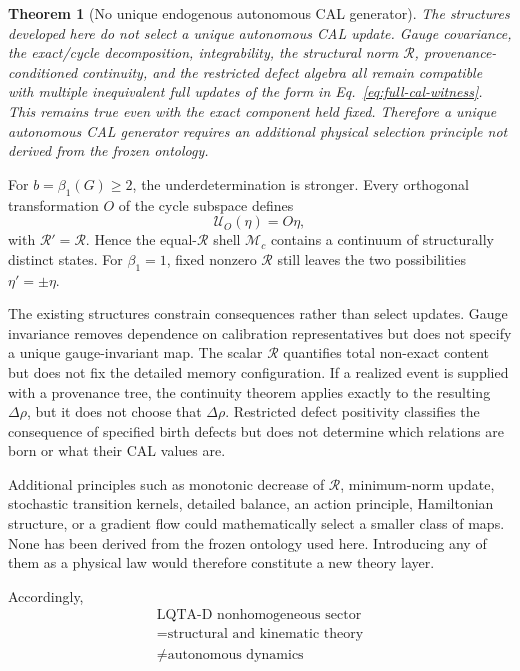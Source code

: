 \documentclass[aip,jmp,amsmath,amssymb,reprint]{revtex4-2}
\newtheorem{theorem}{Theorem}
\newcommand{\Rcal}{\mathcal{R}}
\begin{document}
\begin{theorem}[No unique endogenous autonomous CAL generator]\label{thm:generator-nogo}
The structures developed here do not select a unique autonomous CAL update. Gauge covariance, the exact/cycle decomposition, integrability, the structural norm $\Rcal$, provenance-conditioned continuity, and the restricted defect algebra all remain compatible with multiple inequivalent full updates of the form in Eq.~\eqref{eq:full-cal-witness}. This remains true even with the exact component held fixed. Therefore a unique autonomous CAL generator requires an additional physical selection principle not derived from the frozen ontology.
\end{theorem}

For $b=\beta_1(G)\ge2$, the underdetermination is stronger. Every orthogonal transformation $O$ of the cycle subspace defines
\begin{equation}
\mathcal U_O(\eta)=O\eta,
\end{equation}
with $\Rcal'=\Rcal$. Hence the equal-$\Rcal$ shell $\mathcal M_c$ contains a continuum of structurally distinct states. For $\beta_1=1$, fixed nonzero $\Rcal$ still leaves the two possibilities $\eta'=\pm\eta$.

The existing structures constrain consequences rather than select updates. Gauge invariance removes dependence on calibration representatives but does not specify a unique gauge-invariant map. The scalar $\Rcal$ quantifies total non-exact content but does not fix the detailed memory configuration. If a realized event is supplied with a provenance tree, the continuity theorem applies exactly to the resulting $\Delta\rho$, but it does not choose that $\Delta\rho$. Restricted defect positivity classifies the consequence of specified birth defects but does not determine which relations are born or what their CAL values are.

Additional principles such as monotonic decrease of $\Rcal$, minimum-norm update, stochastic transition kernels, detailed balance, an action principle, Hamiltonian structure, or a gradient flow could mathematically select a smaller class of maps. None has been derived from the frozen ontology used here. Introducing any of them as a physical law would therefore constitute a new theory layer.

Accordingly,
\begin{equation}
\boxed{
\begin{gathered}
\text{LQTA-D nonhomogeneous sector}\\
=\text{structural and kinematic theory}\\
\neq\text{autonomous dynamics}
\end{gathered}
}
\label{eq:structural-closure}
\end{equation}
\end{document}
